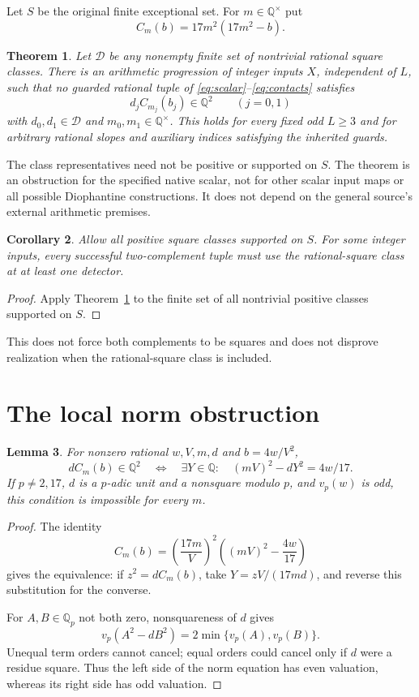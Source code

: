 \documentclass[11pt,a4paper]{article}
\newtheorem{theorem}{Theorem}[section]
\newtheorem{lemma}[theorem]{Lemma}
\newtheorem{corollary}[theorem]{Corollary}
\newcommand{\Q}{\mathbb Q}\newcommand{\Z}{\mathbb Z}
\begin{document}
Let $S$ be the original finite exceptional set. For $m\in\Q^\times$ put
\[
                         C_m(b)=17m^2(17m^2-b).
\]

\begin{theorem}\label{thm:main}
Let $\mathcal D$ be any nonempty finite set of nontrivial rational
square classes. There is an arithmetic progression of integer inputs
$X$, independent of $L$, such that no guarded rational tuple of
\eqref{eq:scalar}--\eqref{eq:contacts} satisfies
\begin{equation}\label{eq:conditions}
              d_jC_{m_j}(b_j)\in\Q^2\qquad(j=0,1)
\end{equation}
with $d_0,d_1\in\mathcal D$ and $m_0,m_1\in\Q^\times$.
This holds for every fixed odd $L\ge3$ and for arbitrary rational
slopes and auxiliary indices satisfying the inherited guards.
\end{theorem}

The class representatives need not be positive or supported on $S$.
The theorem is an obstruction for the specified native scalar, not
for other scalar input maps or all possible Diophantine constructions.
It does not depend on the general source's external arithmetic premises.

\begin{corollary}\label{cor:split}
Allow all positive square classes supported on $S$. For some integer
inputs, every successful two-complement tuple must use the rational-square
class at at least one detector.
\end{corollary}
\begin{proof}
Apply Theorem~\ref{thm:main} to the finite set of all nontrivial
positive classes supported on $S$.
\end{proof}
This does not force both complements to be squares and does not
disprove realization when the rational-square class is included.

\section{The local norm obstruction}
\begin{lemma}\label{lem:norm}
For nonzero rational $w,V,m,d$ and $b=4w/V^2$,
\[
 dC_m(b)\in\Q^2
 \quad\Longleftrightarrow\quad
 \exists Y\in\Q:\quad(mV)^2-dY^2=4w/17.
\]
If $p\ne2,17$, $d$ is a $p$-adic unit and a nonsquare modulo $p$,
and $v_p(w)$ is odd, this condition is impossible for every $m$.
\end{lemma}
\begin{proof}
The identity
\[
 C_m(b)=\left(\frac{17m}{V}\right)^2
               \left((mV)^2-\frac{4w}{17}\right)
\]
gives the equivalence: if $z^2=dC_m(b)$, take
$Y=zV/(17md)$, and reverse this substitution for the converse.

For $A,B\in\Q_p$ not both zero, nonsquareness of $d$ gives
\[
                   v_p(A^2-dB^2)=2\min\{v_p(A),v_p(B)\}.
\]
Unequal term orders cannot cancel; equal orders could cancel only if
$d$ were a residue square. Thus the left side of the norm equation
has even valuation, whereas its right side has odd valuation.
\end{proof}
\end{document}
